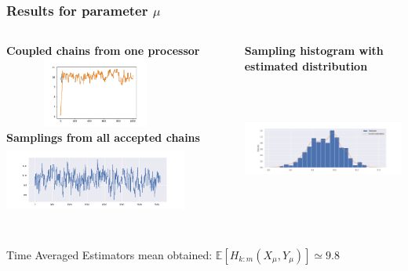 \documentclass{beamer}
\begin{document}
\begin{frame}
	\frametitle{Results for parameter $\mu$}
	\begin{columns}
		\begin{column}{0.4\textwidth}
		{\scriptsize \textbf{Coupled chains from one processor}}\\
		\includegraphics[width=6cm,height=2.3cm]{doublecoupling_chainmeeting/doublecoupling_mu_chain_meeting}
		\vspace{0.2cm}
	{	\scriptsize \textbf{Samplings from all accepted chains }}\\
	\includegraphics[width=6cm,height=2.3cm]{doublecoupling_pack/doublecoupling_sampling_mu}
		\end{column}
	\begin{column}{0.4\textwidth}
		{\scriptsize \textbf{Sampling histogram with estimated distribution}}\\
		\includegraphics[width=6cm,height=5cm]{doublecoupling_pack/doublecoupling_mu_histogram_kernel}
	\end{column}
	\end{columns}

	\small
	Time Averaged Estimators mean obtained:	$ \mathbb{E}[H_{k:m}(X_{\mu}, Y_{\mu})] \simeq 9.8   %
	$
	
	
	
\end{frame}
\end{document}
